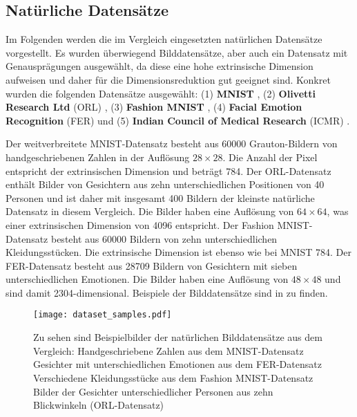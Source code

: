 \subsection{Natürliche Datensätze}
\label{ch:Vergleich:sec:VerwendeteDatensaetze:natuerlich}
Im Folgenden werden die im Vergleich eingesetzten natürlichen Datensätze vorgestellt. Es wurden überwiegend Bilddatensätze, aber auch ein Datensatz mit Genausprägungen ausgewählt, da diese eine
hohe extrinsische Dimension aufweisen und daher für die Dimensionsreduktion gut geeignet sind.
Konkret wurden die folgenden Datensätze ausgewählt: (1) \textbf{MNIST} \parencite{LeCun.2010}, (2) \textbf{Olivetti Research Ltd} (ORL)
\parencite{Samaria.1994}, (3) \textbf{Fashion MNIST} \parencite{Xiao.2017}, (4) \textbf{Facial Emotion Recognition} (FER) \parencite{DumitruIanGoodfellowWillCukierskiYoshuaBengio.2013} und (5) \textbf{Indian Council of
	Medical Research} (ICMR) \parencite{Mohapatra.2022}.

Der weitverbreitete MNIST-Datensatz besteht aus \num{60000} Grauton-Bildern von handgeschriebenen
Zahlen in der Auflösung $28 \times 28$. Die Anzahl der Pixel entspricht der extrinsischen Dimension
und beträgt 784. Der ORL-Datensatz enthält Bilder von Gesichtern aus zehn unterschiedlichen
Positionen von 40 Personen und ist daher mit insgesamt 400 Bildern der kleinste natürliche
Datensatz in diesem Vergleich. Die Bilder haben eine Auflösung von $64 \times 64$, was einer
extrinsischen Dimension von \num{4096} entspricht. Der Fashion MNIST-Datensatz besteht aus
\num{60000} Bildern von zehn unterschiedlichen Kleidungsstücken. Die extrinsische Dimension ist
ebenso wie bei MNIST 784. Der FER-Datensatz besteht aus \num{28 709} Bildern von Gesichtern mit
sieben unterschiedlichen Emotionen. Die Bilder haben eine Auflösung von $48 \times 48$ und sind
damit \num{2304}-dimensional. Beispiele der Bilddatensätze sind in  zu
finden.
\begin{figure}[hbt]
	\begin{center}
		\texttt{[image: dataset\_samples.pdf]}
	\end{center}
	\caption[Beispielbilder der natürlichen Datensätze]{Zu sehen sind Beispielbilder der natürlichen Bilddatensätze aus dem Vergleich: \captiona Handgeschriebene Zahlen aus dem MNIST-Datensatz \captionb Gesichter mit unterschiedlichen Emotionen aus dem FER-Datensatz \captionc Verschiedene Kleidungsstücke aus dem Fashion MNIST-Datensatz \captiond Bilder der Gesichter unterschiedlicher Personen aus zehn Blickwinkeln (ORL-Datensatz)}
	\label{fig:Dataset_samples}
\end{figure}

